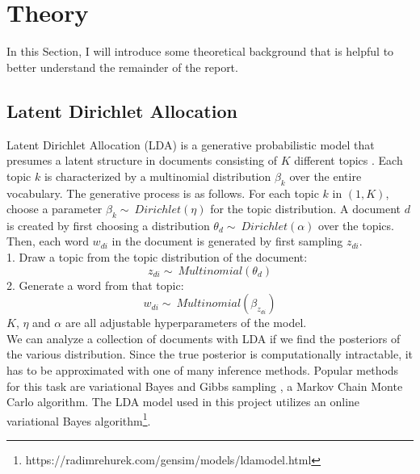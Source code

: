 \documentclass[conference]{IEEEtran}
\begin{document}
\section{Theory}
In this Section, I will introduce some theoretical background that is helpful to better understand the remainder of the report.
\subsection{Latent Dirichlet Allocation} \label{sec:lda}
Latent Dirichlet Allocation (LDA) is a generative probabilistic model that presumes a latent structure in documents consisting of $K$ different topics \cite{hoffman}. Each topic $k$ is characterized by a multinomial distribution $\beta_k$ over the entire vocabulary. The generative process is as follows. For each topic $k$ in $(1,K)$, choose a parameter ${\beta_k \sim\ Dirichlet(\eta)}$ for the topic distribution. A document $d$ is created by first choosing a distribution ${\theta_d \sim\ Dirichlet(\alpha)}$ over the topics. Then, each word $w_{di}$ in the document is generated by first sampling $z_{di}$.\\
1. Draw a topic from the topic distribution of the document:
$${z_{di} \sim\ Multinomial(\theta_d)}$$
2. Generate a word from that topic:
$${w_{di} \sim\ Multinomial(\beta_{z_{di}})}$$
$K$, $\eta$ and $\alpha$ are all adjustable hyperparameters of the model.\\
We can analyze a collection of documents with LDA if we find the posteriors of the various distribution. Since the true posterior is computationally intractable, it has to be approximated with one of many inference methods. Popular methods for this task are variational Bayes \cite{blei} and Gibbs sampling \cite{griffiths}, a Markov Chain Monte Carlo algorithm. The LDA model used in this project utilizes an online variational Bayes algorithm\footnote{https://radimrehurek.com/gensim/models/ldamodel.html}.
\end{document}
